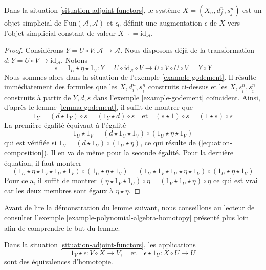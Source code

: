 \begin{lemma}
\label{lemma-standard-simplicial}
Dans la situation \ref{situation-adjoint-functors},
le système $X = (X_n, d^n_j, s^n_j)$
est un objet simplicial de $\text{Fun}(\mathcal{A}, \mathcal{A})$
et $\epsilon_0$ définit une augmentation $\epsilon$ de $X$
vers l'objet simplicial constant de valeur $X_{-1} = \text{id}_\mathcal{A}$.
\end{lemma}

\begin{proof}
Considérons $Y = U \circ V : \mathcal{A} \to \mathcal{A}$.
Nous disposons déjà de la transformation
$d : Y = U \circ V \to \text{id}_\mathcal{A}$. Notons
$$
s = 1_U \star \eta \star 1_V :
Y = U \circ \text{id}_\mathcal{S} \circ V
\longrightarrow
U \circ V \circ U \circ V = Y \circ Y
$$
Nous sommes alors dans la situation de l'exemple \ref{example-godement}.
Il résulte immédiatement des formules que
les $X, d^n_i, s^n_i$ construits ci-dessus et les
$X, s^n_i, s^n_i$ construits à partir de $Y, d, s$
dans l'exemple \ref{example-godement} coïncident. Ainsi, d'après le
lemme \ref{lemma-godement}, il suffit de montrer que
$$
1_Y = (d \star 1_Y) \circ s = (1_Y \star d) \circ s
\quad\text{et}\quad
(s \star 1) \circ s = (1 \star s) \circ s
$$
La première égalité équivaut à l'égalité
$$
1_U \star 1_V = (d \star 1_U \star 1_V) \circ (1_U \star \eta \star 1_V)
$$
qui est vérifiée si $1_U = (d \star 1_U) \circ (1_U \star \eta)$,
ce qui résulte de (\ref{equation-composition}). Il en va de même pour la
seconde égalité. Pour la dernière équation, il faut montrer
$$
(1_U \star \eta \star 1_V \star 1_U \star 1_V) \circ
(1_U \star \eta \star 1_V) =
(1_U \star 1_V \star 1_U \star \eta \star 1_V) \circ
(1_U \star \eta \star 1_V)
$$
Pour cela, il suffit de montrer
$(\eta \star 1_V \star 1_U) \circ \eta = (1_V \star 1_U \star \eta) \circ \eta$
ce qui est vrai car les deux membres sont égaux à $\eta \star \eta$.
\end{proof}

\noindent
Avant de lire la démonstration du lemme suivant, nous conseillons au
lecteur de consulter l'exemple \ref{example-polynomial-algebra-homotopy}
présenté plus loin
afin de comprendre le but du lemme.

\begin{lemma}
\label{lemma-standard-simplicial-homotopy}
Dans la situation \ref{situation-adjoint-functors}, les applications
$$
1_V \star \epsilon : V \circ X \to V,
\quad\text{et}\quad
\epsilon \star 1_U : X \circ U \to U
$$
sont des équivalences d'homotopie.
\end{lemma}

